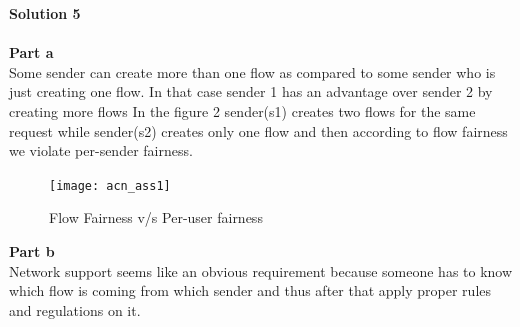 \documentclass[letterpaper, 11pt]{article}
\begin{document}
\textbf{Solution 5}\\ \\
\textbf{Part a} \\
Some sender can create more than one flow as compared to some sender who is just creating one flow. In that case sender 1 has an advantage over sender 2 by creating more flows
In the figure 2 sender(s1) creates two flows for the same request while sender(s2) creates only one flow and then according to flow fairness we violate per-sender fairness.
\begin{figure}[h!]
    \centering
    \texttt{[image: acn\_ass1]}
    \caption{Flow Fairness v/s Per-user fairness}
\end{figure}

\textbf{Part b} \\
Network support seems like an obvious requirement because someone has to know which flow is coming from which sender and thus after that apply proper rules and regulations on it.
\clearpage

\end{document}
